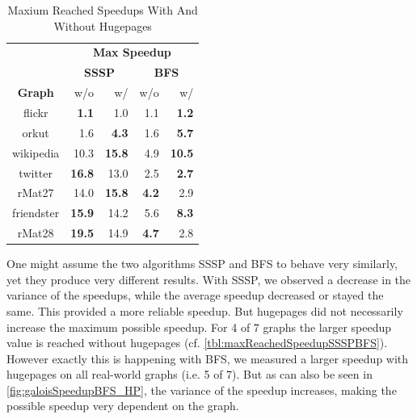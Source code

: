 \begin{table}
	\caption{Maxium Reached Speedups With And Without Hugepages}
	\label{tbl:maxReachedSpeedupSSSPBFS}
	\renewcommand{\arraystretch}{1.3}
	\centering
	\begin{tabular}{cr@{\tabskip 2 \tabcolsep}rr@{\tabskip 2 \tabcolsep}r}
		\toprule
		&\multicolumn{4}{c}{\bf Max Speedup}\\
		&\multicolumn{2}{c}{\bf SSSP}&\multicolumn{2}{c}{\bf BFS}\\
		\cmidrule{2-3}\cmidrule{4-5}
		\bf Graph & w/o & w/&w/o&w/\\
		\midrule
		flickr & \bf 1.1 &  1.0 & 1.1 & \bf 1.2 \\
		orkut & 1.6 & \bf 4.3 & 1.6 & \bf 5.7 \\
		wikipedia & 10.3 & \bf 15.8 & 4.9 & \bf 10.5 \\
		twitter & \bf 16.8 &  13.0 & 2.5 & \bf 2.7 \\
		rMat27 & 14.0 & \bf 15.8 & \bf 4.2 & 2.9 \\
		friendster & \bf 15.9 &  14.2 & 5.6 & \bf 8.3 \\
		rMat28 & \bf 19.5 &  14.9 & \bf 4.7 & 2.8 \\
		\bottomrule
	\end{tabular}
\end{table}
One might assume the two algorithms SSSP and BFS to behave very similarly, yet they produce very different results.
With SSSP, we observed a decrease in the variance of the speedups, while the average speedup decreased or stayed the same. This provided a more reliable speedup. 
But hugepages did not necessarily increase the maximum possible speedup. For 4 of 7 graphs the larger speedup value is reached without hugepages (cf. \autoref{tbl:maxReachedSpeedupSSSPBFS}).
However exactly this is happening with BFS, we measured a larger speedup with hugepages on all real-world graphs (i.e. 5 of 7).
But as can also be seen in \autoref{fig:galoisSpeedupBFS_HP}, the variance of the speedup increases, making the possible speedup very dependent on the graph.





